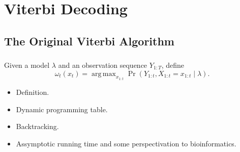 \documentclass[english,notes]{beamer}
\DeclareMathOperator*{\argmax}{arg\,max}
\begin{document}
\begin{frame}
  \frametitle{\insertsection}
  \begin{columns}
  \end{columns}
\end{frame}

\section{Viterbi Decoding}

\subsection{The Original Viterbi Algorithm}
\begin{frame}
  \frametitle{\insertsubsection}
  Given a model $\lambda$ and an observation sequence $Y_{1:T}$, define
  \begin{equation*}
    \omega_t(x_t) = \argmax_{x_{1:t}} \Pr (Y_{1:t}, X_{1:t} = x_{1:t} \mid
    \lambda).
  \end{equation*}  

  \begin{itemize}
    \tiny
  \item Definition.
  \item Dynamic programming table.
  \item Backtracking.
  \item Assymptotic running time and some perspectivation to bioinformatics.
  \end{itemize}
\end{frame}
\end{document}
